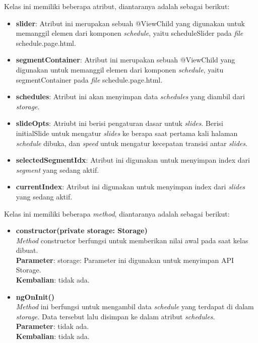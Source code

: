 \begin{enumerate}
			Kelas ini memiliki beberapa atribut, diantaranya adalah sebagai berikut:
			\begin{itemize} 
				\item \textbf{slider}: Atribut ini merupakan sebuah @ViewChild yang digunakan untuk memanggil elemen dari komponen \textit{schedule}, yaitu scheduleSlider pada \textit{file} schedule.page.html.
				\item \textbf{segmentContainer}: Atribut ini merupakan sebuah @ViewChild yang digunakan untuk memanggil elemen dari komponen \textit{schedule}, yaitu segmentContainer pada \textit{file} schedule.page.html.
				\item \textbf{schedules}: Atribut ini akan menyimpan data \textit{schedules} yang diambil dari \textit{storage}.
				\item \textbf{slideOpts}: Atriubt ini berisi pengaturan dasar untuk \textit{slides}. Berisi initialSlide untuk mengatur \textit{slides} ke berapa saat pertama kali halaman \textit{schedule} dibuka, dan \textit{speed} untuk mengatur kecepatan transisi antar \textit{slides}.
				\item \textbf{selectedSegmentIdx}: Atribut ini digunakan untuk menyimpan index dari \textit{segment} yang sedang aktif.
				\item \textbf{currentIndex}: Atribut ini digunakan untuk menyimpan index dari \textit{slides} yang sedang aktif.
			\end{itemize}
			Kelas ini memiliki beberapa \textit{method}, diantaranya adalah sebagai berikut:
			\begin{itemize}
				\item \textbf{constructor(private storage: Storage)}\\ 
					\textit{Method} constructor berfungsi untuk memberikan nilai awal pada saat kelas dibuat. \\
					\textbf{Parameter}: storage: Parameter ini digunakan untuk menyimpan API Storage.\\
					\textbf{Kembalian}: tidak ada.
					\newpage
					
				\item \textbf{ngOnInit()}\\ 
				\textit{Method} ini berfungsi untuk mengambil data \textit{schedule} yang terdapat di dalam \textit{storage}. Data tersebut lalu disimpan ke dalam atribut \textit{schedules}. \\
				\textbf{Parameter}: tidak ada. \\
				\textbf{Kembalian}: tidak ada.
				

\end{itemize}
\end{enumerate}
